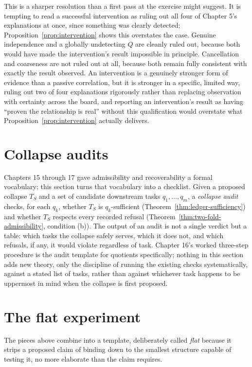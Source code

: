 \documentclass[11pt]{book}
\begin{document}
This is a sharper resolution than a first pass at the exercise might suggest. It is tempting to read a successful intervention as ruling out all four of Chapter 5's explanations at once, since something was clearly detected; Proposition~\ref{prop:intervention} shows this overstates the case. Genuine independence and a globally undetecting $Q$ are cleanly ruled out, because both would have made the intervention's result impossible in principle. Cancellation and coarseness are not ruled out at all, because both remain fully consistent with exactly the result observed. An intervention is a genuinely stronger form of evidence than a passive correlation, but it is stronger in a specific, limited way, ruling out two of four explanations rigorously rather than replacing observation with certainty across the board, and reporting an intervention's result as having ``proven the relationship is real'' without this qualification would overstate what Proposition~\ref{prop:intervention} actually delivers.

\section{Collapse audits}

Chapters 15 through 17 gave admissibility and recoverability a formal vocabulary; this section turns that vocabulary into a checklist. Given a proposed collapse $T_S$ and a set of candidate downstream tasks $q_1,\ldots,q_m$, a \emph{collapse audit} checks, for each $q_k$, whether $T_S$ is $q_k$-sufficient (Theorem~\ref{thm:ledger-sufficiency}) and whether $T_S$ respects every recorded refusal (Theorem~\ref{thm:two-fold-admissibility}, condition (b)). The output of an audit is not a single verdict but a table: which tasks the collapse safely serves, which it does not, and which refusals, if any, it would violate regardless of task. Chapter 16's worked three-step procedure is the audit template for quotients specifically; nothing in this section adds new theory, only the discipline of running the existing checks systematically, against a stated list of tasks, rather than against whichever task happens to be uppermost in mind when the collapse is first proposed.

\section{The flat experiment}

The pieces above combine into a template, deliberately called \emph{flat} because it strips a proposed claim of binding down to the smallest structure capable of testing it, no more elaborate than the claim requires.
\end{document}
